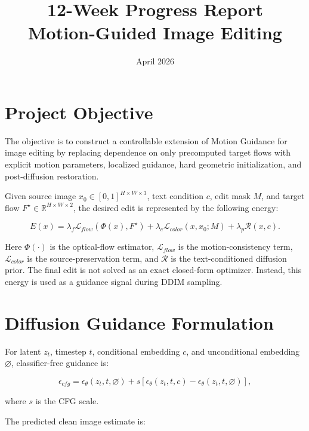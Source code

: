 \documentclass[11pt,a4paper]{article}
\title{\textbf{12-Week Progress Report}\\Motion-Guided Image Editing}
\author{}
\date{April 2026}
\begin{document}
\maketitle
\vspace{-1.5em}

\section{Project Objective}

The objective is to construct a controllable extension of Motion Guidance for image editing by replacing dependence on only precomputed target flows with explicit motion parameters, localized guidance, hard geometric initialization, and post-diffusion restoration.

Given source image \(x_0 \in [0,1]^{H \times W \times 3}\), text condition \(c\), edit mask \(M\), and target flow \(F^\star \in \mathbb{R}^{H \times W \times 2}\), the desired edit is represented by the following energy:

\begin{equation}
E(x)=
\lambda_f \mathcal{L}_{flow}\!\left(\Phi(x),F^\star\right)
+ \lambda_c \mathcal{L}_{color}(x,x_0;M)
+ \lambda_p \mathcal{R}(x,c).
\end{equation}

Here \(\Phi(\cdot)\) is the optical-flow estimator, \(\mathcal{L}_{flow}\) is the motion-consistency term, \(\mathcal{L}_{color}\) is the source-preservation term, and \(\mathcal{R}\) is the text-conditioned diffusion prior. The final edit is not solved as an exact closed-form optimizer. Instead, this energy is used as a guidance signal during DDIM sampling.

\section{Diffusion Guidance Formulation}

For latent \(z_t\), timestep \(t\), conditional embedding \(c\), and unconditional embedding \(\varnothing\), classifier-free guidance is:

\begin{equation}
\epsilon_{cfg}
= \epsilon_\theta(z_t,t,\varnothing)
+ s\left[
\epsilon_\theta(z_t,t,c)-\epsilon_\theta(z_t,t,\varnothing)
\right],
\end{equation}

where \(s\) is the CFG scale.

The predicted clean image estimate is:
\end{document}
